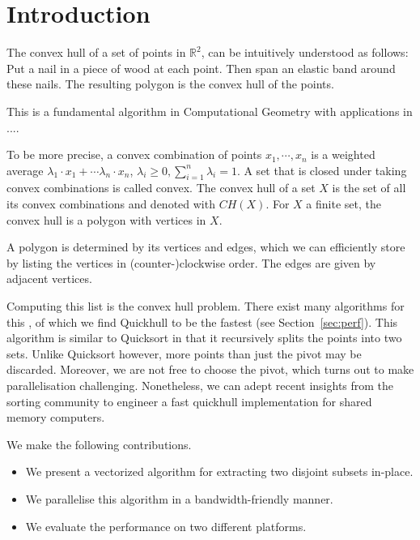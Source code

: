 \section{Introduction}

The convex hull of a set of points in $\mathbb{R}^2$, can be intuitively 
understood as follows: Put a nail in a piece of wood at each point. Then span 
an elastic band around these nails. The resulting polygon is the convex hull of 
the points.

This is a fundamental algorithm in Computational Geometry with applications
in .... 

To be more precise, a convex combination of points $x_1, \cdots, x_n$ is a 
weighted average $\lambda_1 \cdot x_1 + \cdots \lambda_n \cdot x_n$, 
$\lambda_i \geq 0, \sum_{i = 1}^n \lambda_i = 1$. A set that is closed under
taking convex combinations is called convex. The convex hull of a set $X$ is
the set of all its convex combinations and denoted with $CH(X)$. For $X$
a finite set, the convex hull is a polygon with vertices in $X$.

A polygon is determined by its vertices and edges, which we can efficiently
store by listing the vertices in (counter-)clockwise order. The edges are given 
by adjacent vertices.

Computing this list is the convex hull problem. There exist many algorithms for 
this \cite{}, of which we find Quickhull to be the fastest (see
Section~\ref{sec:perf}). This algorithm is similar to Quicksort in that
it recursively splits the points into two sets. Unlike Quicksort however,
more points than just the pivot may be discarded. Moreover, we are not
free to choose the pivot, which turns out to make parallelisation challenging.
Nonetheless, we can adept recent insights from the sorting community to engineer
a fast quickhull implementation for shared memory computers.

We make the following contributions.

\begin{itemize}
    \item We present a vectorized algorithm for extracting two disjoint
          subsets in-place.
    \item We parallelise this algorithm in a bandwidth-friendly manner.
    \item We evaluate the performance on two different platforms. 
\end{itemize}
